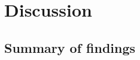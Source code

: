 \chapter{Discussion}
\label{chap:disc}
\vspace*{3cm}
\section{Summary of findings}
\Blindtext[1]
\vfill